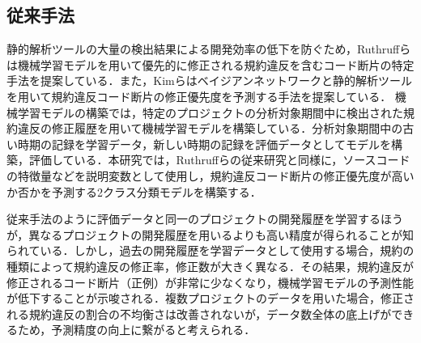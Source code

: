\documentclass[T,J]{fose} %
\begin{document}
\subsection{従来手法}
静的解析ツールの大量の検出結果による開発効率の低下を防ぐため，Ruthruffらは機械学習モデルを用いて優先的に修正される規約違反を含むコード断片の特定手法を提案している\cite{JyuraiPre}．また，Kimらはベイジアンネットワークと静的解析ツールを用いて規約違反コード断片の修正優先度を予測する手法を提案している\cite{beizu}．
機械学習モデルの構築では，特定のプロジェクトの分析対象期間中に検出された規約違反の修正履歴を用いて機械学習モデルを構築している．分析対象期間中の古い時期の記録を学習データ，新しい時期の記録を評価データとしてモデルを構築，評価している．本研究では，Ruthruffらの従来研究と同様に，ソースコードの特徴量などを説明変数として使用し，規約違反コード断片の修正優先度が高いか否かを予測する2クラス分類モデルを構築する．




従来手法のように評価データと同一のプロジェクトの開発履歴を学習するほうが，異なるプロジェクトの開発履歴を用いるよりも高い精度が得られることが知られている．しかし，過去の開発履歴を学習データとして使用する場合，規約の種類によって規約違反の修正率，修正数が大きく異なる\cite{Panichella}．その結果，規約違反が修正されるコード断片（正例）が非常に少なくなり，機械学習モデルの予測性能が低下することが示唆される．複数プロジェクトのデータを用いた場合，修正される規約違反の割合の不均衡さは改善されないが，データ数全体の底上げができるため，予測精度の向上に繋がると考えられる．
\end{document}
